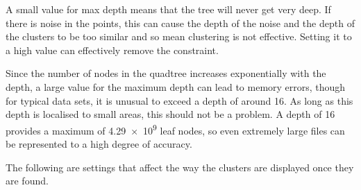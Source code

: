 \begin{description}
		A small value for max depth means that the tree will never get very
		deep. If there is noise in the points, this can cause the depth of the
		noise and the depth of the clusters to be too similar and so mean
		clustering is not effective. Setting it to a high value can effectively
		remove the constraint.

		Since the number of nodes in the quadtree increases exponentially with
		the depth, a large value for the maximum depth can lead to memory
		errors, though for typical data sets, it is unusual to exceed a depth
		of around 16. As long as this depth is localised to small areas, this
		should not be a problem. A depth of 16 provides a maximum of
		\num{4.29e9} leaf nodes, so even extremely large files can be
		represented to a high degree of accuracy.

\end{description}

The following are settings that affect the way the clusters are displayed once
they are found.

